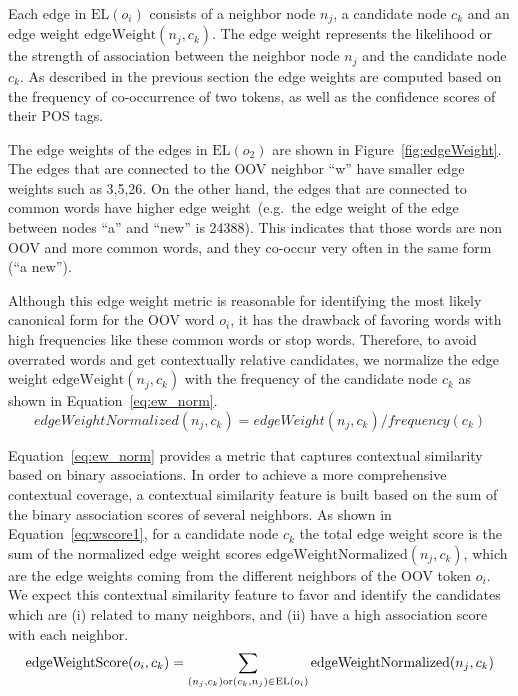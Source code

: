 \documentclass[a4paper,onesided,12pt]{report}
\begin{document}
Each edge in $\text{EL}(o_i)$ consists of a neighbor node $n_j$, a candidate node $c_k$ and an edge weight $\text{edgeWeight}(n_j,c_k)$. The edge weight represents the likelihood or the strength of association between the neighbor node $n_j$ and the candidate node $c_k$. As described in the previous section the edge weights are computed based on the frequency of co-occurrence of two tokens, as well as the confidence scores of their POS tags.

The edge weights of the edges in $\text{EL}(o_2)$ are shown in Figure~\ref{fig:edgeWeight}. The edges that are connected to the OOV neighbor ``w'' have smaller edge weights such as 3,5,26. On the other hand, the edges that are connected to common words have higher edge weight~(e.g.~the edge weight of the edge between nodes ``a'' and ``new'' is 24388). This indicates that those words are non OOV and more common words, and they co-occur very often in the same form (``a new'').

Although this edge weight metric is reasonable for identifying the most likely canonical form for the OOV word $o_i$, it has the drawback of favoring words with high frequencies like these common words or stop words. Therefore, to avoid overrated words and get contextually relative candidates, we normalize the edge weight $\text{edgeWeight}(n_j,c_k)$ with the frequency of the candidate node $c_k$ as shown in Equation~\ref{eq:ew_norm}.
\begin{equation}
edgeWeightNormalized(n_j,c_k) = edgeWeight(n_j,c_k) / frequency(c_k)
\label{eq:ew_norm}
\end{equation}

Equation~\ref{eq:ew_norm} provides a metric that captures contextual similarity based on binary associations.
In order to achieve a more comprehensive contextual coverage, a contextual similarity feature is built based on the sum of the binary association scores of several neighbors. As shown in Equation~\ref{eq:wscore1}, for a candidate node $c_k$ the total edge weight score is the sum of the normalized edge weight scores $\text{edgeWeightNormalized}(n_j,c_k)$, which are the edge weights coming from the different neighbors of the OOV token $o_i$. We expect this contextual similarity feature to favor and identify the candidates which are (i) related to many neighbors, and (ii) have a high association score with each neighbor.
\begin{equation}
\text{edgeWeightScore}(o_i,c_k) = \sum_{(n_j,c_k) \text{or} (c_k,n_j) \in \text{EL}(o_i)}{\text{edgeWeightNormalized}(n_j,c_k)} \\\\
\label{eq:wscore1}
\end{equation}
\end{document}
